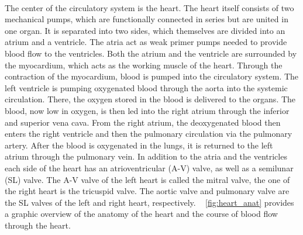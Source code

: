  \\The center of the circulatory system is the heart. The heart itself consists of two mechanical pumps, which are functionally connected in series but are united in one organ. It is separated into two sides, which themselves are divided into an atrium and a ventricle. The atria act as weak primer pumps needed to provide blood flow to the ventricles.\cite{HKS4} Both the atrium and the ventricle are surrounded by the myocardium, which acts as the working muscle of the heart. Through the contraction of the myocardium, blood is pumped into the circulatory system.\cite{HKS7} The left ventricle is pumping oxygenated blood through the aorta into the systemic circulation. There, the oxygen stored in the blood is delivered to the organs. The blood, now low in oxygen, is then led into the right atrium through the inferior and superior vena cava. From the right atrium, the deoxygenated blood then enters the right ventricle and then the pulmonary circulation via the pulmonary artery. After the blood is oxygenated in the lungs, it is returned to the left atrium through the pulmonary vein.\cite{HKS4} In addition to the atria and the ventricles each side of the heart has an atrioventricular (A-V) valve, as well as a semilunar (SL) valve. The A-V valve of the left heart is called the mitral valve, the one of the right heart is the tricuspid valve. The aortic valve and pulmonary valve are the SL valves of the left and right heart, respectively.\cite{HKS7} \figurename~ \ref{fig:heart_anat} provides a graphic overview of the anatomy of the heart and the course of blood flow through the heart.

